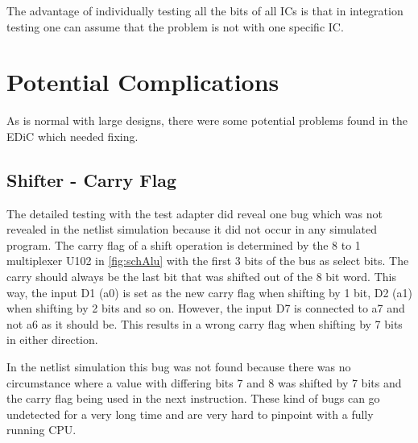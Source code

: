 The advantage of individually testing all the bits of all \glspl{IC} is that in integration testing one can assume that the problem is not with one specific \gls{IC}.
\section{Potential Complications}\label{sec:switchGlitch}
As is normal with large designs, there were some potential problems found in the \gls{EDiC} which needed fixing.
\subsection{Shifter - Carry Flag}
The detailed testing with the test adapter did reveal one bug which was not revealed in the netlist simulation because it did not occur in any simulated program.
The carry flag of a shift operation is determined by the 8 to 1 multiplexer U102 in \cref{fig:schAlu} with the first 3 bits of the bus as select bits.
The carry should always be the last bit that was shifted out of the 8 bit word.
This way, the input D1 (a0) is set as the new carry flag when shifting by 1 bit, D2 (a1) when shifting by 2 bits and so on.
However, the input D7 is connected to a7 and not a6 as it should be.
This results in a wrong carry flag when shifting by 7 bits in either direction.

In the netlist simulation this bug was not found because there was no circumstance where a value with differing bits 7 and 8 was shifted by 7 bits and the carry flag being used in the next instruction.
These kind of bugs can go undetected for a very long time and are very hard to pinpoint with a fully running \gls{CPU}.

